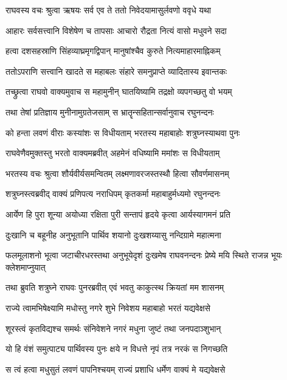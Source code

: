 \twolineshloka
{राघवस्य वचः श्रुत्वा ऋषयः सर्व एव ते}
{ततो निवेदयामासुर्लवणो ववृधे यथा} %

\twolineshloka
{आहारः सर्वसत्त्वानि विशेषेण च तापसाः}
{आचारो रौद्रता नित्यं वासो मधुवने सदा} %

\twolineshloka
{हत्वा दशसहस्राणि सिंहव्याघ्रमृगद्विपान्}
{मानुषांश्चैव कुरुते नित्यमाहारमाह्निकम्} %

\twolineshloka
{ततोऽपराणि सत्त्वानि खादते स महाबलः}
{संहारे समनुप्राप्ते व्यादितास्य इवान्तकः} %

\twolineshloka
{तच्छ्रुत्वा राघवो वाक्यमुवाच स महामुनीन्}
{घातयिष्यामि तद्रक्षो व्यपगच्छतु वो भयम्} %

\twolineshloka
{तथा तेषां प्रतिज्ञाय मुनीनामुग्रतेजसाम्}
{स भ्रातॄन्सहितान्सर्वानुवाच रघुनन्दनः} %

\twolineshloka
{को हन्ता लवणं वीराः कस्यांशः स विधीयताम्}
{भरतस्य महाबाहोः शत्रुघ्नस्याथवा पुनः} %

\twolineshloka
{राघवेणैवमुक्तस्तु भरतो वाक्यमब्रवीत्}
{अहमेनं वधिष्यामि ममांशः स विधीयताम्} %

\twolineshloka
{भरतस्य वचः श्रुत्वा शौर्यवीर्यसमन्वितम्}
{लक्ष्मणावरजस्तस्थौ हित्वा सौवर्णमासनम्} %

\twolineshloka
{शत्रुघ्नस्त्वब्रवीद् वाक्यं प्रणिपत्य नराधिपम्}
{कृतकर्मा महाबाहुर्मध्यमो रघुनन्दनः} %

\twolineshloka
{आर्येण हि पुरा शून्या अयोध्या रक्षिता पुरी}
{सन्तापं हृदये कृत्वा आर्यस्यागमनं प्रति} %

\twolineshloka
{दुःखानि च बहूनीह अनुभूतानि पार्थिव}
{शयानो दुःखशय्यासु नन्दिग्रामे महात्मना} %

\threelineshloka
{फलमूलाशनो भूत्वा जटाचीरधरस्तथा}
{अनुभूयेदृशं दुःखमेष राघवनन्दनः}
{प्रेष्ये मयि स्थिते राजन्न भूयः क्लेशमाप्नुयात्} %

\twolineshloka
{तथा ब्रुवति शत्रुघ्ने राघवः पुनरब्रवीत्}
{एवं भवतु काकुत्स्थ क्रियतां मम शासनम्} %

\twolineshloka
{राज्ये त्वामभिषेक्ष्यामि मधोस्तु नगरे शुभे}
{निवेशय महाबाहो भरतं यद्यवेक्षसे} %

\twolineshloka
{शूरस्त्वं कृतविद्यश्च समर्थः संनिवेशने}
{नगरं मधुना जुष्टं तथा जनपदाञ्शुभान्} %

\twolineshloka
{यो हि वंशं समुत्पाट्य पार्थिवस्य पुनः क्षये}
{न विधत्ते नृपं तत्र नरकं स निगच्छति} %

\twolineshloka
{स त्वं हत्वा मधुसुतं लवणं पापनिश्चयम्}
{राज्यं प्रशाधि धर्मेण वाक्यं मे यद्यवेक्षसे} %

